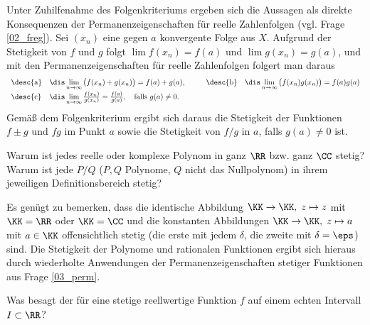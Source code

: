 \begin{antwort}
  Unter Zuhilfenahme des Folgenkriteriums ergeben sich die Aussagen als 
  direkte Konsequenzen der Permanenzeigenschaften für reelle Zahlenfolgen 
  (vgl. Frage \ref{02_freg}). 
  Sei $(x_n)$ eine gegen $a$ konvergente Folge aus $X$. 
  Aufgrund der Stetigkeit von $f$ und $g$ folgt
  $\lim f(x_n)=f(a)$ und $\lim g(x_n)=g(a)$, und mit den    
  Permanenzeigenschaften für reelle Zahlenfolgen folgert man daraus 
  \[
  \begin{array}{llp{3mm}ll}
    \text{\desc{a}} & \dis\lim\limits_{n\to\infty}\big( f(x_n)+g(x_n) \big)=
    f(a)+g(a), & &
    \text{\desc{b}} & \dis\lim\limits_{n\to\infty}\big( f(x_n)g(x_n) \big)=
    f(a)g(a) \\[2mm]
    \text{\desc{c}} & \dis\lim\limits_{n\to\infty}
    \frac{f(x_n)}{g(x_n)} = \frac{f(a)}{g(a)}, 
    \quad\text{falls $g(a)\not=0$.} & & & 
  \end{array}
  \]
  Gemäß dem Folgenkriterium ergibt sich daraus 
  die Stetigkeit der Funktionen $f\pm g$ und $fg$ im Punkt $a$
  sowie die Stetigkeit von 
  $f/g$ in $a$, falls $g(a)\not=0$ ist.
  \AntEnd
\end{antwort}

\begin{frage}\label{03_pols}
  Warum ist jedes reelle oder komplexe Polynom in ganz $\RR$ bzw. 
  ganz $\CC$ stetig? 
  Warum ist jede  $P/Q$ ($P,Q$ Polynome, 
  $Q$ nicht das Nullpolynom) in ihrem jeweiligen Definitionsbereich stetig?
\end{frage}

\begin{antwort}
  Es genügt zu bemerken, dass die identische Abbildung 
  $\KK \to \KK, \; z\mapsto z$ mit $\KK=\RR$ oder $\KK=\CC$ und die 
  konstanten Abbildungen $\KK\to \KK,\; z\mapsto a$ 
  mit $a\in \KK$ offensichtlich stetig (die erste mit jedem $\delta$, die 
  zweite mit $\delta=\eps$) sind. 
  Die Stetigkeit der Polynome und rationalen Funktionen 
  ergibt sich hieraus durch wiederholte Anwendungen 
  der Permanenzeigenschaften stetiger Funktionen aus Frage \ref{03_perm}.  
  \AntEnd
\end{antwort} 

\begin{frage}
  \label{03_bolz}
  Was besagt der  für eine stetige 
  reellwertige Funktion $f$ auf einem echten Intervall $I\subset \RR$?
\end{frage}

